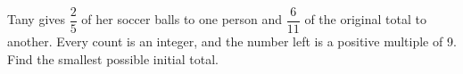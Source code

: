 Tany gives $\dfrac{2}{5}$ of her soccer balls to one person and $\dfrac{6}{11}$ of the original total to another. Every count is an integer, and the number left is a positive multiple of 9. Find the smallest possible initial total.
